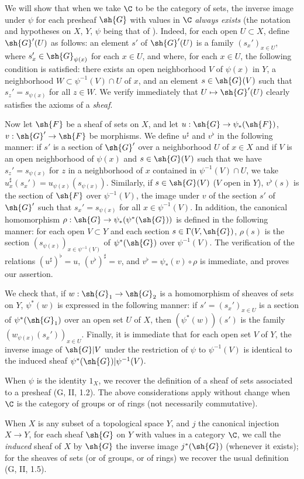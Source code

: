 \begin{env}[3.7.1]
\label{0.3.7.1}
We will show that when we take $\C$ to be the category of sets, the inverse
image under $\psi$ for each presheaf $\sh{G}$ with values in $\C$ \emph{always
exists} (the notation and hypotheses on $X$, $Y$, $\psi$ being that of
). Indeed, for each open $U\subset X$, define $\sh{G}'(U)$
as follows: an element $s'$ of $\sh{G}'(U)$ is a family $(s_x')_{x\in U}$, where
$s_x'\in\sh{G}_{\psi(x)}$ for each $x\in U$, and where, for each $x\in U$, the
following condition is satisfied: there exists an open neighborhood $V$ of
$\psi(x)$ in $Y$, a neighborhood $W\subset\psi^{-1}(V)\cap U$ of $x$, and an
element $s\in\sh{G}(V)$ such that $s_z'=s_{\psi(x)}$ for all $z\in W$. We verify
immediately that $U\mapsto\sh{G}'(U)$ clearly satisfies the axioms of a
\emph{sheaf}.

Now let $\sh{F}$ be a sheaf of sets on $X$, and let $u:\sh{G}\to\psi_*(\sh{F})$,
$v:\sh{G}'\to\sh{F}$ be morphisms. We define $u^\sharp$ and $v^\flat$ in the
following manner: if $s'$ is a section of $\sh{G}'$ over a neighborhood $U$ of
$x\in X$ and if $V$ is an open neighborhood of $\psi(x)$ and $s\in\sh{G}(V)$
such that we have $s_z'=s_{\psi(x)}$ for $z$ in a neighborhood of $x$ contained
in $\psi^{-1}(V)\cap U$, we take $u_x^\sharp(s_x')=u_{\psi(x)}(s_{\psi(x)})$.
Similarly, if $s\in\sh{G}(V)$ ($V$ open in $Y$), $v^\flat(s)$ is the section of
$\sh{F}$ over $\psi^{-1}(V)$, the image under $v$ of the section $s'$ of
$\sh{G}'$ such that $s_x'=s_{\psi(x)}$ for all $x\in\psi^{-1}(V)$. In addition,
the canonical homomorphism 
$\rho:\sh{G}\to\psi_*(\psi^*(\sh{G}))$ is defined in the following manner: for
each open $V\subset Y$ and each section $s\in\Gamma(V,\sh{G})$, $\rho(s)$ is the
section $(s_{\psi(x)})_{x\in\psi^{-1}(V)}$ of $\psi^*(\sh{G})$ over
$\psi^{-1}(V)$. The verification of the relations $(u^\sharp)^\flat=u$,
$(v^\flat)^\sharp=v$, and $v^\flat=\psi_*(v)\circ\rho$ is immediate, and proves
our assertion.

We check that, if $w:\sh{G}_1\to\sh{G}_2$ is a homomorphism of sheaves of sets
on $Y$, $\psi^*(w)$ is expressed in the following manner: if
$s'=(s_x')_{x\in U}$ is a section of $\psi^*(\sh{G}_1)$ over an open set $U$ of
$X$, then $(\psi^*(w))(s')$ is the family $(w_{\psi(x)}(s_x'))_{x\in U}$.
Finally, it is immediate that for each open set $V$ of $Y$, the inverse image of
$\sh{G}|V$ under the restriction of $\psi$ to $\psi^{-1}(V)$ is identical to the
induced sheaf $\psi^*(\sh{G})|\psi^{-1}(V)$.

When $\psi$ is the identity $1_X$, we recover the definition of a sheaf of sets
associated to a presheaf (G, II, 1.2). The above considerations apply without
change when $\C$ is the category of groups or of rings (not necessarily
commutative).

When $X$ is any subset of a topological space $Y$, and $j$ the canonical
injection $X\to Y$, for each sheaf $\sh{G}$ on $Y$ with values in a category
$\C$, we call the \emph{induced} sheaf of $X$ by $\sh{G}$ the inverse image
$j^*(\sh{G})$ (whenever it exists); for the sheaves of sets (or of groups, or of
rings) we recover the usual definition (G, II, 1.5).
\end{env}

